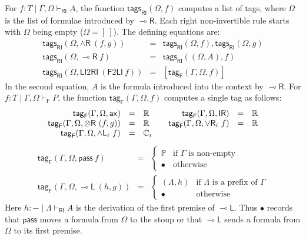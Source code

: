 \documentclass[submission,copyright,creativecommons]{eptcs}
\theoremstyle{definition}
\newcommand{\tr}{\otimes \mathsf{R}}
\newcommand{\lright}{{\multimap}\mathsf{R}}
\newcommand{\lleft}{{\multimap}\mathsf{L}}
\newcommand{\pass}{\mathsf{pass}}
\newcommand{\unitr}{\mathsf{IR}}
\newcommand{\andli}{\land \mathsf{L}_{i}}
\newcommand{\andr}{\land \mathsf{R}}
\newcommand{\orri}{\lor \mathsf{R}_{i}}
\newcommand{\ax}{\mathsf{ax}}
\newcommand{\RI}{\mathsf{RI}}
\newcommand{\LI}{\mathsf{LI}}
\newcommand{\F}{\mathsf{F}}
\newcommand{\tP}{\mathbb{P}}
\newcommand{\tE}{\mathbb{R}}
\begin{document}
For $f:T\mid\Gamma,\Omega\vdash_\RI A$, the function $\mathsf{tags}_{\RI}(\Omega,f)$ computes a list of tags, where $\Omega$ is the list of formulae introduced by $\lright$. Each right non-invertible rule starts with $\Omega$ being empty ($\Omega = [~]$). The defining equations are:
\begin{displaymath}
  \begin{array}{rcl}
    \mathsf{tags}_{\RI}(\Omega,\andr\ (f,g)) &=& \mathsf{tags}_{\RI}(\Omega,f),\mathsf{tags}_{\RI}(\Omega,g) \\
    \mathsf{tags}_{\RI}(\Omega,\lright\ f) &=& \mathsf{tags}_{\RI}((\Omega,A),f) \\
    \mathsf{tags}_{\RI}(\Omega,\LI2\RI\ (\F2\LI\ f)) &=& [\mathsf{tag}_{\F}(\Gamma,\Omega,f)]
  \end{array}
\end{displaymath}
In the second equation, $A$ is the formula introduced into the context by $\lright$. For $f:T\mid\Gamma,\Omega\vdash_\F P$, the function $\mathsf{tag}_{\F}(\Gamma,\Omega,f)$ computes a single tag as follows:
\begin{displaymath}
  \begin{array}{rcl@{\qquad}rcl}
    \mathsf{tag}_{\F}(\Gamma,\Omega,\ax) &=& \tE & \mathsf{tag}_{\F}(\Gamma,\Omega,\unitr) &=& \tE \\
    \mathsf{tag}_{\F}(\Gamma,\Omega,\tr\ (f,g)) &=& \tE & \mathsf{tag}_{\F}(\Gamma,\Omega,\orri\ f) &=& \tE \\
    \mathsf{tag}_{\F}(\Gamma,\Omega,\andli\ f) &=& \mathbb{C}_i
  \end{array}
\end{displaymath}
\begin{displaymath}
  \begin{array}{rcl}
    \mathsf{tag}_{\F}(\Gamma,\Omega,\pass\ f) &=&
    \begin{cases}
      \tP & \text{if }\Gamma \text{ is non-empty} \\
      \bullet & \text{otherwise}
    \end{cases}
    \\[8pt]
    \mathsf{tag}_{\F}(\Gamma,\Omega,\lleft\ (h,g)) &=&
    \begin{cases}
      (\Lambda,h) & \text{if }\Lambda\text{ is a prefix of }\Gamma \\
      \bullet & \text{otherwise}
    \end{cases}
  \end{array}
\end{displaymath}
Here $h:{-}\mid\Lambda\vdash_\RI A$ is the derivation of the first premise of $\lleft$. Thus $\bullet$ records that $\pass$ moves a formula from $\Omega$ to the stoup or that $\lleft$ sends a formula from $\Omega$ to its first premise. 
\end{document}
